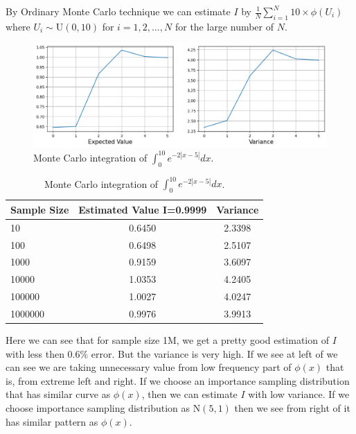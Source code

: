 \begin{example}
    By Ordinary Monte Carlo technique we can estimate $I$ by $\frac{1}{N}\sum_{i = 1}^{N} 10 \times \phi(U_i)$ where $U_i\sim \text{U}(0,10)$ for $i=1,2,\ldots,N$
	for the large number of $N$.
	\begin{figure}[H]
		\centering
		\includegraphics[width=1\textwidth]{images/importance-sampling/example1/int_h(x)_MC.png}
		\caption{Monte Carlo integration of $\int_{0}^{10} e^{-2 |x-5|} dx$.}
		\label{MC:IntegrationOFe-2|x*5|}
	\end{figure}
	\begin{table}[h]
		\centering
		\begin{tabular}{|l|c|c|}
			\hline
			Sample Size & Estimated Value I=0.9999 & Variance \\
            \hline
            10 & 0.6450 & 2.3398 \\ 
            100 & 0.6498 & 2.5107 \\ 
            1000 & 0.9159 & 3.6097 \\
            10000 & 1.0353 & 4.2405 \\
            100000 & 1.0027 & 4.0247 \\ 
            1000000 & 0.9976 & 3.9913 \\
            \hline
        \end{tabular}
		\caption{Monte Carlo integration of $\int_{0}^{10} e^{-2 |x-5|} dx$.}
		\label{tab:IntegrationOFe-2|x*5|}
	\end{table}
	Here we can see that for sample size 1M, we get a pretty good estimation of $I$ with less then $0.6\%$ error. But the variance is very high.
	If we see at left of  we can see we are taking unnecessary value from low frequency part of $\phi(x)$ that is,
	from extreme left and right. If we choose an importance sampling distribution that has similar curve as $\phi(x)$, then we can estimate $I$ with low variance.
    If we choose importance sampling distribution as $\text{N}(5,1)$ then we see from right of  it has similar pattern as $\phi(x)$.
	\begin{figure}[H]

\end{figure}
\end{example}

